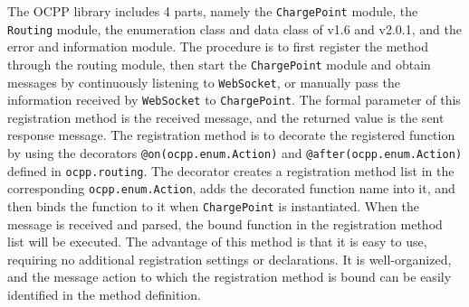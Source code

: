 \documentclass[
	english,
	ruledheaders=section,%
	class=report,%
	thesis={type=Report},%
	accentcolor=9c,%
	custommargins=true,%
	marginpar=false,%
	parskip=half-,%
	fontsize=11pt,%
	logofile={img/tuda_logo.pdf}, %
]{tudapub}
\begin{document}
The \ac{OCPP} library includes 4 parts, namely the \texttt{ChargePoint} module, the \texttt{Routing} module, the enumeration class and data class of v1.6 and v2.0.1, and the error and information module. The procedure is to first register the method through the routing module, then start the \texttt{ChargePoint} module and obtain messages by continuously listening to \texttt{WebSocket}, or manually pass the information received by \texttt{WebSocket} to \texttt{ChargePoint}. The formal parameter of this registration method is the received message, and the returned value is the sent response message. The registration method is to decorate the registered function by using the decorators \texttt{@on(ocpp.enum.Action)} and \texttt{@after(ocpp.enum.Action)} defined in \texttt{ocpp.routing}. The decorator creates a registration method list in the corresponding \texttt{ocpp.enum.Action}, adds the decorated function name into it, and then binds the function to it when \texttt{ChargePoint} is instantiated. When the message is received and parsed, the bound function in the registration method list will be executed.
The advantage of this method is that it is easy to use, requiring no additional registration settings or declarations. It is well-organized, and the message action to which the registration method is bound can be easily identified in the method definition. 
\end{document}
